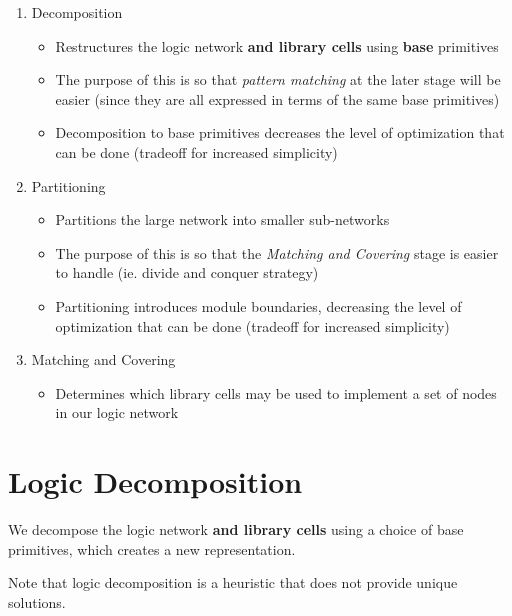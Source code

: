 \documentclass{article}
\begin{document}
\begin{enumerate}
    \item Decomposition
        \begin{itemize}
            \item Restructures the logic network \textbf{and library cells} using \textbf{base} primitives
            \item The purpose of this is so that \textit{pattern matching} at the later stage will be easier (since they are all expressed in terms of the same base primitives)
            \item Decomposition to base primitives decreases the level of optimization that can be done (tradeoff for increased simplicity)
        \end{itemize}
    \item Partitioning
        \begin{itemize}
            \item Partitions the large network into smaller sub-networks
            \item The purpose of this is so that the \textit{Matching and Covering} stage is easier to handle (ie. divide and conquer strategy)
            \item Partitioning introduces module boundaries, decreasing the level of optimization that can be done (tradeoff for increased simplicity)
        \end{itemize}
    \item Matching and Covering
        \begin{itemize}
            \item Determines which library cells may be used to implement a set of nodes in our logic network
        \end{itemize}
\end{enumerate}

\section{Logic Decomposition}
We decompose the logic network \textbf{and library cells} using a choice of base primitives, which creates a new representation.

Note that logic decomposition is a heuristic that does not provide unique solutions.
\end{document}
